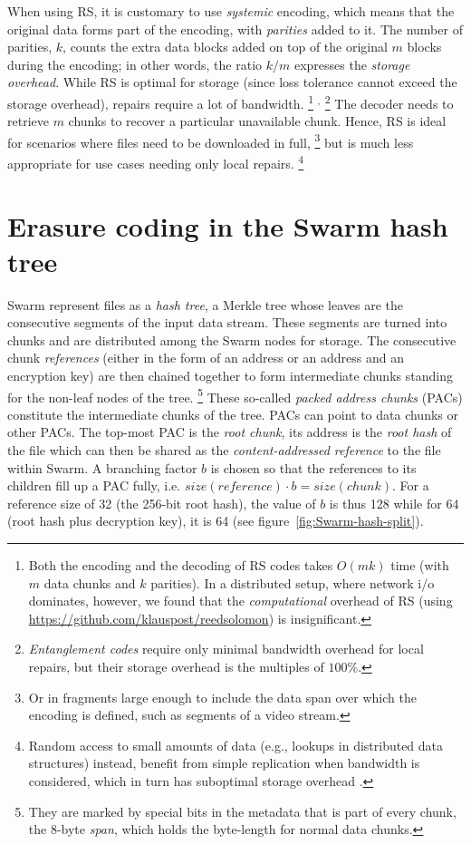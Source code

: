 \documentclass[manuscript,screen,review]{acmart}
\begin{document}
When using RS, it is customary to use \emph{systemic} encoding, which means that the original data forms part of the encoding, with \emph{parities} added to it. The number of parities, $k$, counts the extra data blocks added on top of the original $m$  blocks  during the encoding; in other words, the ratio $k/m$ expresses the \emph{storage overhead}. While RS is optimal for storage (since loss tolerance cannot exceed the storage overhead), repairs require a lot of bandwidth.%
%
\footnote{Both the encoding and the decoding of RS codes takes $O(mk)$ time (with $m$ data chunks and $k$ parities). In a distributed setup, where network i/o dominates, however, we found that the \emph{computational} overhead of RS (using \url{https://github.com/klauspost/reedsolomon}) is insignificant.}%
$^,$%
\footnote{\emph{Entanglement codes} \citep{estrada2018alpha, estrada2019building} require only minimal bandwidth overhead for local repairs, but their storage overhead is the multiples of $100\%$.}
%
The decoder needs to retrieve $m$ chunks to recover a particular unavailable chunk.
Hence, RS is ideal for scenarios where files need to be downloaded in full,%
%
\footnote{Or in fragments large enough to include the data span over which the encoding is defined, such as segments of a video stream.}
%
 but is much less appropriate for use cases needing only local repairs.%
%
\footnote{Random access to small amounts of data (e.g., lookups in distributed data structures) instead, benefit from simple replication when bandwidth  is considered, which in turn has suboptimal storage overhead \citep{weatherspoon2002erasure}.}


\section{Erasure coding in the Swarm hash tree}
\label{sec:erasure}

Swarm represent files as a \emph{hash tree}, a Merkle tree \citep{merkle1980protocols} whose leaves are the consecutive segments of the input data stream. These segments are turned into chunks and are distributed among the Swarm nodes for storage. The consecutive chunk \emph{references} (either in the form of an address or an address and an encryption key) are then chained together to form intermediate chunks standing for the non-leaf nodes of the tree.%
%
\footnote{They are marked by special bits in the metadata that is part of every chunk, the 8-byte \emph{span}, which holds the byte-length for normal data chunks.}
%
These so-called \emph{packed address chunks} (PACs) constitute the intermediate chunks of the tree. PACs can point to data chunks or other PACs. The top-most PAC is the \emph{root chunk}, its address is the \emph{root hash} of the file which can then be shared as the \emph{content-addressed reference} to the file within Swarm. 
A branching factor $b$ is chosen so that the references to its children fill up a PAC fully, i.e. $\mathit{size}(\mathit{reference})\cdot b = \mathit{size}(\mathit{chunk})$.
For a reference size of 32 (the 256-bit root hash), the value of $b$ is thus 128 while for 64 (root hash plus decryption key), it is 64 (see figure~\ref{fig:Swarm-hash-split}).
\end{document}
